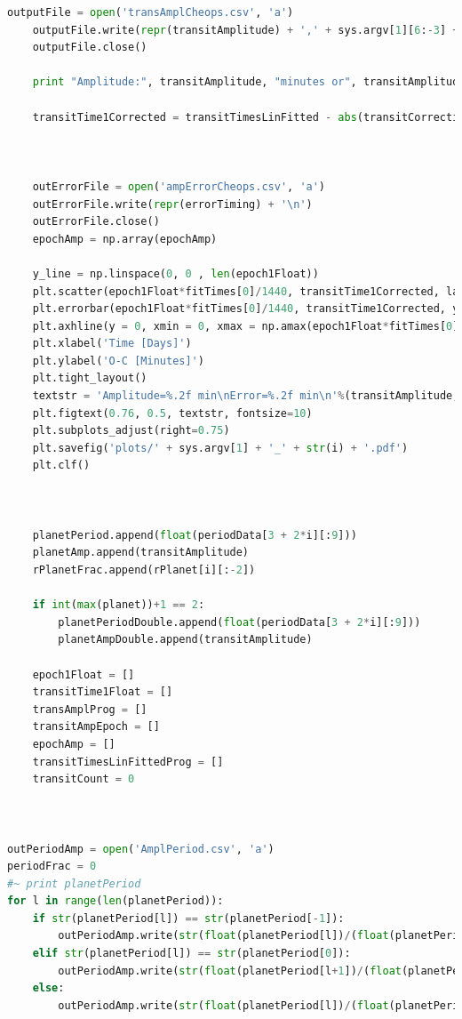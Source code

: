 \documentclass[12pt]{report}
\begin{document}
\begin{appendix}
\begin{lstlisting}[language=Python]
	outputFile = open('transAmplCheops.csv', 'a')
	outputFile.write(repr(transitAmplitude) + ',' + sys.argv[1][6:-3] + '\n')
	outputFile.close()

	print "Amplitude:", transitAmplitude, "minutes or", transitAmplitude/60, "hours"

	transitTime1Corrected = transitTimesLinFitted - abs(transitCorrection)

	
		
	outErrorFile = open('ampErrorCheops.csv', 'a')
	outErrorFile.write(repr(errorTiming) + '\n')
	outErrorFile.close()
	epochAmp = np.array(epochAmp)

	y_line = np.linspace(0, 0 , len(epoch1Float))
	plt.scatter(epoch1Float*fitTimes[0]/1440, transitTime1Corrected, label='Transit Time')
	plt.errorbar(epoch1Float*fitTimes[0]/1440, transitTime1Corrected, yerr = errorTiming, linestyle="None")
	plt.axhline(y = 0, xmin = 0, xmax = np.amax(epoch1Float*fitTimes[0]/1440), c = 'black')
	plt.xlabel('Time [Days]')
	plt.ylabel('O-C [Minutes]')
	plt.tight_layout()
	textstr = 'Amplitude=%.2f min\nError=%.2f min\n'%(transitAmplitude, errorTiming)
	plt.figtext(0.76, 0.5, textstr, fontsize=10)
	plt.subplots_adjust(right=0.75)
	plt.savefig('plots/' + sys.argv[1] + '_' + str(i) + '.pdf')
	plt.clf()
	

	
	planetPeriod.append(float(periodData[3 + 2*i][:9]))
	planetAmp.append(transitAmplitude)
	rPlanetFrac.append(rPlanet[i][:-2])
	
	if int(max(planet))+1 == 2:
		planetPeriodDouble.append(float(periodData[3 + 2*i][:9]))
		planetAmpDouble.append(transitAmplitude)
	
	epoch1Float = []
	transitTime1Float = []
	transAmplProg = []
	transitAmpEpoch = []
	epochAmp = []
	transitTimesLinFittedProg = []
	transitCount = 0

	

outPeriodAmp = open('AmplPeriod.csv', 'a')
periodFrac = 0
#~ print planetPeriod
for l in range(len(planetPeriod)):
	if str(planetPeriod[l]) == str(planetPeriod[-1]):
		outPeriodAmp.write(str(float(planetPeriod[l])/(float(planetPeriod[l-1]))) + ',' + str(rPlanet[l][:-2]) + ',' + str(planetAmp[l]) + ',' + str(errorTiming) + '\n')
	elif str(planetPeriod[l]) == str(planetPeriod[0]):
		outPeriodAmp.write(str(float(planetPeriod[l+1])/(float(planetPeriod[l]))) + ',' + str(rPlanet[l][:-2]) + ',' + str(planetAmp[l]) + ',' + str(errorTiming) + '\n')
	else:
		outPeriodAmp.write(str(float(planetPeriod[l])/(float(planetPeriod[l-1]))) + ',' + str(rPlanet[l][:-2]) + ',' + str(planetAmp[l]) + ',' + str(errorTiming) + '\n')
		

\end{lstlisting}
\end{appendix}
\end{document}

